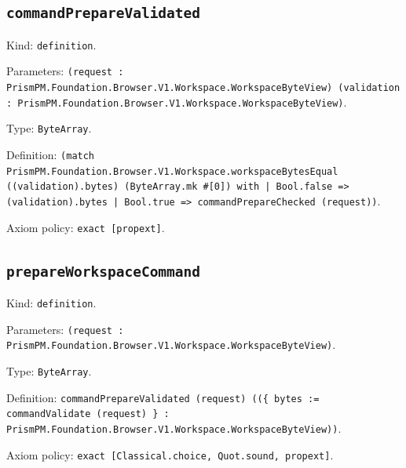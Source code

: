\documentclass[11pt]{article}
\begin{document}
\subsection*{\texttt{commandPrepareValidated}}
\noindent Kind: \texttt{definition}.\par
\noindent Parameters: \texttt{(request : PrismPM.Foundation.Browser.V1.Workspace.WorkspaceByteView) (validation : PrismPM.Foundation.Browser.V1.Workspace.WorkspaceByteView)}.\par
\noindent Type: \texttt{ByteArray}.\par
\noindent Definition: \texttt{(match PrismPM.Foundation.Browser.V1.Workspace.workspaceBytesEqual ((validation).bytes) (ByteArray.mk \#[0]) with | Bool.false => (validation).bytes | Bool.true => commandPrepareChecked (request))}.\par
\noindent Axiom policy: \texttt{exact [propext]}.\par
\subsection*{\texttt{prepareWorkspaceCommand}}
\noindent Kind: \texttt{definition}.\par
\noindent Parameters: \texttt{(request : PrismPM.Foundation.Browser.V1.Workspace.WorkspaceByteView)}.\par
\noindent Type: \texttt{ByteArray}.\par
\noindent Definition: \texttt{commandPrepareValidated (request) ((\{ bytes := commandValidate (request) \} : PrismPM.Foundation.Browser.V1.Workspace.WorkspaceByteView))}.\par
\noindent Axiom policy: \texttt{exact [Classical.choice, Quot.sound, propext]}.\par
\end{document}
